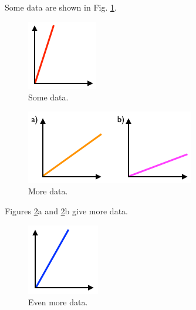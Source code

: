 Some data are shown in Fig. \ref{fig:data}.

\begin{figure}[htbp]
\centering
\includegraphics{img/plot1.png}
\caption{Some data.\label{fig:data}}
\end{figure}

\begin{figure}[htbp]
\centering
\includegraphics{img/plot2.png}
\caption{More data.\label{fig:more}}
\end{figure}

Figures \ref{fig:more}a and \ref{fig:more}b give more data.

\begin{figure}[htbp]
\centering
\includegraphics{img/plot3.png}
\caption{Even more data.\label{fig:__-6973662507347131338__}}
\end{figure}
